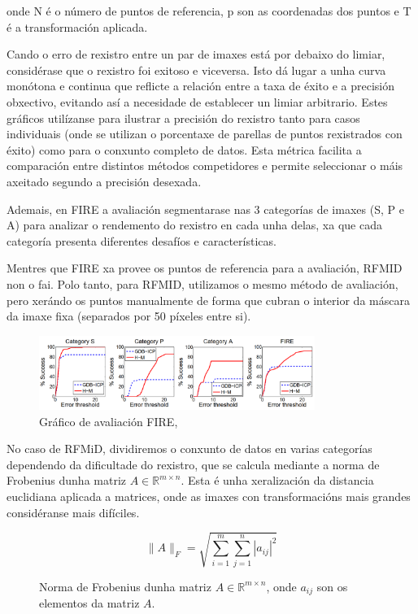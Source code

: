 onde N é o número de puntos de referencia, p son as coordenadas dos puntos e T é a transformación aplicada.

Cando o erro de rexistro entre un par de imaxes está por debaixo do limiar, considérase que o rexistro foi exitoso e viceversa. Isto dá lugar a unha curva monótona e continua que reflicte a relación entre a taxa de éxito e a precisión obxectivo, evitando así a necesidade de establecer un limiar arbitrario. 
Estes gráficos utilízanse para ilustrar a precisión do rexistro tanto para casos individuais (onde se utilizan o porcentaxe de parellas de puntos rexistrados con éxito)
como para o conxunto completo de datos.
Esta métrica facilita a comparación entre distintos métodos competidores e permite seleccionar o máis axeitado segundo a precisión desexada.
 
Ademais, en FIRE a avaliación segmentarase nas 3 categorías de imaxes (S, P e A) para analizar o rendemento do rexistro en cada unha delas, xa que cada categoría presenta diferentes desafíos e características.

 Mentres que FIRE xa provee os puntos de referencia para a avaliación, RFMID non o fai.
 Polo tanto, para RFMID, utilizamos o mesmo método de avaliación, pero xerándo os puntos manualmente de forma que cubran o interior da máscara da imaxe fixa (separados por 50 píxeles entre si).
 
 \begin{figure}[ht]
    \centering
    \includegraphics[width=0.8\textwidth]{imaxes/fire_aval.png}
    \caption{Gráfico de avaliación FIRE, \cite{FIRE}}
    \label{fig:fire_aval}
\end{figure}

No caso de RFMiD, dividiremos o conxunto de datos en varias categorías dependendo da dificultade do rexistro, que se calcula mediante a norma de Frobenius dunha matriz $A \in \mathbb{R}^{m \times n}$.
Esta é unha xeralización da distancia euclidiana aplicada a matrices, onde as imaxes con transformacións mais grandes considéranse mais difíciles.

\begin{figure}[ht]
    \centering
    \[
    \|A\|_F = \sqrt{\sum_{i=1}^{m} \sum_{j=1}^{n} |a_{ij}|^2}
    \]
    \caption{Norma de Frobenius dunha matriz $A \in \mathbb{R}^{m \times n}$, onde $a_{ij}$ son os elementos da matriz $A$.}
    \label{fig:frobenius_norm}
\end{figure}

